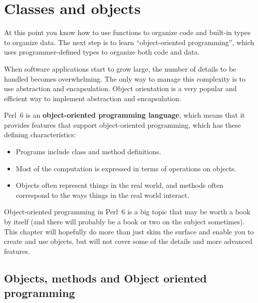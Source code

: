 \chapter{Classes and objects}
\label{objects}


At this point you know how to use functions to organize code and 
built-in types to organize data.  The next step is to learn
``object-oriented programming'', which uses programmer-defined types
to organize both code and data.

When software applications start to grow large, the number of 
details to be handled becomes overwhelming. The only 
way to manage this complexity is to use abstraction and 
encapsulation. Object orientation is a very popular and efficient 
way to implement abstraction and encapsulation.

Perl~6 is an {\bf object-oriented programming language}, which means
that it provides features that support object-oriented
programming, which has these defining characteristics:

\begin{itemize}

\item Programs include class and method definitions.

\item Most of the computation is expressed in terms of operations on
  objects.

\item Objects often represent things in the real world, and methods 
often correspond to the ways things in the real world interact.

\end{itemize}


Object-oriented programming in 
Perl~6 is a big topic that may be worth a book by itself (and 
there will probably be a book or two on the subject sometimes). This 
chapter will hopefully do more than just skim the surface 
and enable you to create and use objects, but will not 
cover some of the details and more advanced features.

\section{Objects, methods and Object oriented programming}

